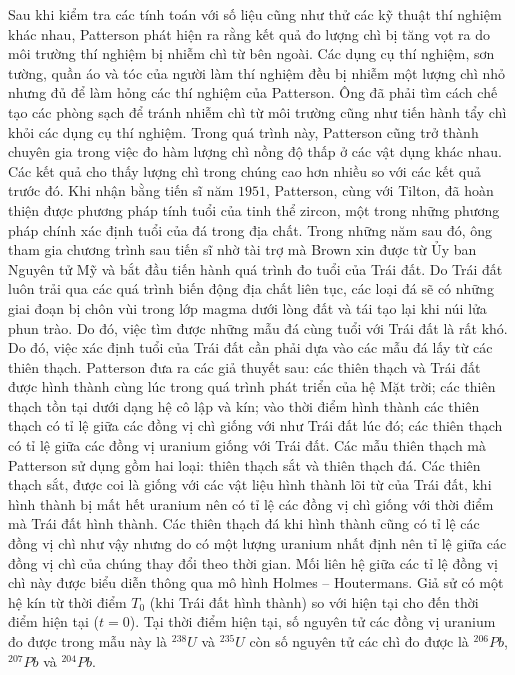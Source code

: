 \begin{multicols}{2}
	Sau khi kiểm tra các tính toán với số liệu cũng như thử các kỹ thuật thí nghiệm khác nhau, Patterson phát hiện ra rằng kết quả đo lượng chì bị tăng vọt ra do môi trường thí nghiệm bị nhiễm chì từ bên ngoài. Các dụng cụ thí nghiệm, sơn tường, quần áo và tóc của người làm thí nghiệm đều bị nhiễm một lượng chì nhỏ nhưng đủ để làm hỏng các thí nghiệm của Patterson. Ông đã phải tìm cách chế tạo các phòng sạch để tránh nhiễm chì từ môi trường cũng như tiến hành tẩy chì khỏi các dụng cụ thí nghiệm. Trong quá trình này, Patterson cũng trở thành chuyên gia trong việc đo hàm lượng chì nồng độ thấp ở các vật dụng khác nhau. Các kết quả cho thấy lượng chì trong chúng cao hơn nhiều so với các kết quả trước đó.
	Khi nhận bằng tiến sĩ năm $1951$, Patterson, cùng với Tilton, đã hoàn thiện được phương pháp tính tuổi của tinh thể zircon, một trong những phương pháp chính xác định tuổi của đá trong địa chất. Trong những năm sau đó, ông tham gia chương trình sau tiến sĩ nhờ tài trợ mà Brown xin được từ Ủy ban Nguyên tử Mỹ và bắt đầu tiến hành quá trình đo tuổi của Trái đất.
	\vskip 0.1cm
	Do Trái đất luôn trải qua các quá trình biến động địa chất liên tục, các loại đá sẽ có những giai đoạn bị chôn vùi trong lớp magma dưới lòng đất và tái tạo lại khi núi lửa phun trào. Do đó, việc tìm được những mẫu đá cùng tuổi với Trái đất là rất khó. Do đó, việc xác định tuổi của Trái đất cần phải dựa vào các mẫu đá lấy từ các thiên thạch. Patterson đưa ra các giả thuyết sau: các thiên thạch và Trái đất được hình thành cùng lúc trong quá trình phát triển của hệ Mặt trời; các thiên thạch tồn tại dưới dạng hệ cô lập và kín; vào thời điểm hình thành các thiên thạch có tỉ lệ giữa các đồng vị chì giống với như Trái đất lúc đó; các thiên thạch có tỉ lệ giữa các đồng vị uranium giống với Trái đất.
	\vskip 0.1cm
	Các mẫu thiên thạch mà Patterson sử dụng gồm hai loại: thiên thạch sắt và thiên thạch đá. Các thiên thạch sắt, được coi là giống với các vật liệu hình thành lõi từ của Trái đất, khi hình thành bị mất hết uranium nên có tỉ lệ các đồng vị chì giống với thời điểm mà Trái đất hình thành. Các thiên thạch đá khi hình thành cũng có tỉ lệ các đồng vị chì như vậy nhưng do có một lượng uranium nhất định nên tỉ lệ giữa các đồng vị chì của chúng thay đổi theo thời gian. Mối liên hệ giữa các tỉ lệ đồng vị chì này được biểu diễn thông qua mô hình Holmes -- Houtermans.
	\vskip 0.1cm
	Giả sử có một hệ kín từ thời điểm $T_0$ (khi Trái đất hình thành) so với hiện tại cho đến thời điểm hiện tại ($t=0$). Tại thời điểm hiện tại, số nguyên tử các đồng vị uranium đo được trong mẫu này là  $^{238}U$ và $^{235}U$ còn số nguyên tử các chì đo được là $^{206}Pb$, $^{207}Pb$ và $^{204}Pb$.

\end{multicols}
